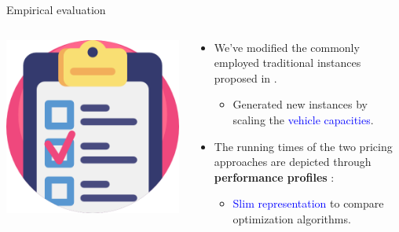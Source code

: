 \begin{frame}{Empirical evaluation}
	\begin{columns}
		\begin{column}{0.2\textwidth}
			\centering
			\includegraphics[width=\textwidth]{./Imgs/testing.png}
		\end{column}
		\begin{column}{0.8\textwidth}
			\begin{itemize}
				\item We've modified the commonly employed traditional instances proposed in
				      \cite{dantzig1959, christofides1969, gaskell1967bases, gillett1974heuristic,christofides1979vehicle,fisher1994,augerat1995}.
				      \begin{itemize}
					      \item Generated new instances by scaling the \textcolor{blue}{vehicle capacities}.
				      \end{itemize}
				\item The running times of the two pricing approaches are depicted through \textbf{performance profiles} \parencite{dolan2002}:
				      \begin{itemize}
					      \item \textcolor{blue}{Slim representation} to compare optimization algorithms.
				      \end{itemize}
			\end{itemize}
		\end{column}
	\end{columns}
\end{frame}

